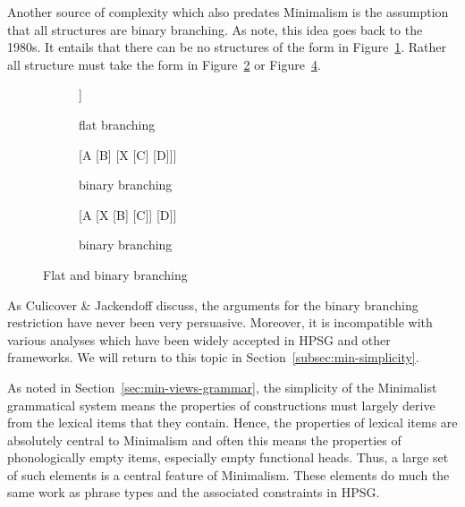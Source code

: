 \documentclass[output=paper]{langsci/langscibook}
\begin{document}
Another source of complexity which also predates Minimalism is the assumption that all structures are binary branching. As  \citet[112--116]{CJ2005a} note, this idea goes back to the 1980s. It entails that there can be no structures of the form in Figure~\ref{fig:min-trinary}. Rather all structure must take the form in Figure~\ref{fig:min-binary-a} or Figure~\ref{fig:min-binary-b}.
\begin{figure}
\hfill
\begin{subfigure}{0.3\textwidth}
\centering
	\begin{forest} %
		[A
		[B][C][D]]
	\end{forest}
	\caption{\label{fig:min-trinary}flat branching}
\end{subfigure}
\hfill
\begin{subfigure}{0.3\textwidth}
\centering
	\begin{forest} %
		[A
		  [B]
		  [X 
                    [C] 
                    [D]]]
	\end{forest}
	\caption{\label{fig:min-binary-a}binary branching}
\end{subfigure}
\hfill
\begin{subfigure}{0.3\textwidth}
\centering
	\begin{forest} %
		[A
		  [X 
                    [B]
                    [C]]
		  [D]]
	\end{forest}
	\caption{\label{fig:min-binary-b}binary branching}
\end{subfigure}
\hfill\mbox{}
\caption{Flat and binary branching}
\end{figure}
%
As Culicover \& Jackendoff discuss, the arguments for the binary branching restriction have never been very persuasive. Moreover, it is incompatible with various analyses which have been widely accepted in HPSG and other frameworks. We will return to this topic in Section~\ref{subsec:min-simplicity}.

As noted in Section~\ref{sec:min-views-grammar}, the simplicity of the Minimalist grammatical system means the properties of constructions must largely derive from the lexical items that they contain. Hence, the properties of lexical items are absolutely central to Minimalism and often this means the properties of phonologically empty items, especially empty functional heads. Thus, a large set of such elements is a central feature of Minimalism. These elements do much the same work as phrase types and the associated constraints in HPSG.
\end{document}
